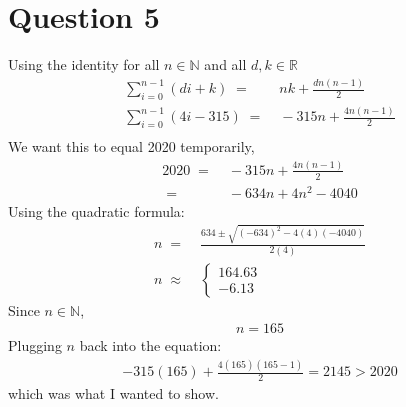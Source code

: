 \documentclass[12pt, a4paper]{article}
\begin{document}
\section*{Question 5}
Using the identity for all $n \in \mathbb{N}$ and all $d, k \in \mathbb{R}$
\begin{align*}
    \sum_{i=0}^{n-1} (di +k) \;=&\; nk + \frac{dn(n-1)}{2} \\
    \sum_{i=0}^{n-1} (4i-315) \;=&\; -315n + \frac{4n(n-1)}{2} \\
\end{align*}
We want this to equal 2020 temporarily,
\begin{align*}
    2020 \;=&\; -315n + \frac{4n(n-1)}{2}\\
     \;=&\; -634n + 4n^2 -4040
\end{align*}
Using the quadratic formula:
\begin{align*}
    n \;=&\; \frac{634 \pm \sqrt{(-634)^2 - 4(4)(-4040)}}{2(4)} \\
    n \;\approx&\; 
    \begin{cases}
    164.63 \\
    -6.13
    \end{cases}
\end{align*}
Since $n \in \mathbb{N}$,
\begin{align*}
    n = 165
\end{align*}
Plugging $n$ back into the equation:
\begin{align*}
    -315(165) + \frac{4(165)(165-1)}{2} = 2145 >2020 
\end{align*}
which was what I wanted to show.
\end{document}
